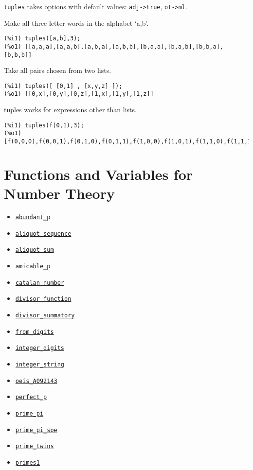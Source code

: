 \documentclass[]{article}
\begin{document}
\vspace{5 pt}

{\tt tuples} takes options with default values: {\tt adj->true}, {\tt ot->ml}.
\vspace{5 pt}


   Make all three letter words in the alphabet `a,b'. 

\begin{Verbatim}[frame=single]
(%i1) tuples([a,b],3);
(%o1) [[a,a,a],[a,a,b],[a,b,a],[a,b,b],[b,a,a],[b,a,b],[b,b,a],[b,b,b]]
\end{Verbatim}

   Take all pairs chosen from two lists. 

\begin{Verbatim}[frame=single]
(%i1) tuples([ [0,1] , [x,y,z] ]);
(%o1) [[0,x],[0,y],[0,z],[1,x],[1,y],[1,z]]
\end{Verbatim}

   tuples works for expressions other than lists. 

\begin{Verbatim}[frame=single]
(%i1) tuples(f(0,1),3);
(%o1) [f(0,0,0),f(0,0,1),f(0,1,0),f(0,1,1),f(1,0,0),f(1,0,1),f(1,1,0),f(1,1,1)]
\end{Verbatim}


\section{Functions and Variables for Number Theory}
\begin{itemize}
\item \hyperlink{abundant_p}{{\tt abundant\_p}}
\item \hyperlink{aliquot_sequence}{{\tt aliquot\_sequence}}
\item \hyperlink{aliquot_sum}{{\tt aliquot\_sum}}
\item \hyperlink{amicable_p}{{\tt amicable\_p}}
\item \hyperlink{catalan_number}{{\tt catalan\_number}}
\item \hyperlink{divisor_function}{{\tt divisor\_function}}
\item \hyperlink{divisor_summatory}{{\tt divisor\_summatory}}
\item \hyperlink{from_digits}{{\tt from\_digits}}
\item \hyperlink{integer_digits}{{\tt integer\_digits}}
\item \hyperlink{integer_string}{{\tt integer\_string}}
\item \hyperlink{oeis_A092143}{{\tt oeis\_A092143}}
\item \hyperlink{perfect_p}{{\tt perfect\_p}}
\item \hyperlink{prime_pi}{{\tt prime\_pi}}
\item \hyperlink{prime_pi_soe}{{\tt prime\_pi\_soe}}
\item \hyperlink{prime_twins}{{\tt prime\_twins}}
\item \hyperlink{primes1}{{\tt primes1}}
\end{itemize}
\end{document}
